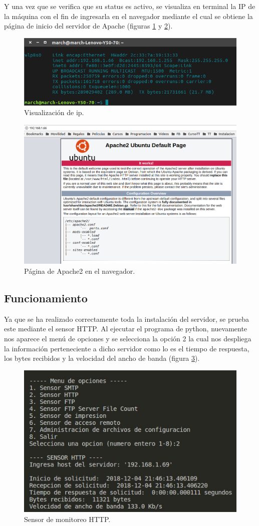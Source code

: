 Y una vez que se verifica que su status es activo, se visualiza en terminal la IP de la máquina con el fin de ingresarla en el navegador mediante el cual se obtiene la página de inicio del servidor de Apache (figuras \ref{image:http3} y \ref{image:http4}).

\FloatBarrier
\begin{figure}[htbp!]
		\centering
			\includegraphics[width=.75 \textwidth]{images/http3}
		\caption{Visualización de ip.}
		\label{image:http3}
\end{figure}
\FloatBarrier

\FloatBarrier
\begin{figure}[htbp!]
		\centering
			\includegraphics[width=.75 \textwidth]{images/http4}
		\caption{Página de Apache2 en el navegador.}
		\label{image:http4}
\end{figure}
\FloatBarrier

\subsection{Funcionamiento}
Ya que se ha realizado correctamente toda la instalación del servidor, se prueba este mediante el sensor HTTP. Al ejecutar el programa de python, nuevamente nos aparece el menú de opciones y se selecciona la opción 2 la cual nos despliega la información perteneciente a dicho servidor como lo es el tiempo de respuesta, los bytes recibidos y la velocidad del ancho de banda (figura \ref{image:http5}).

\FloatBarrier
\begin{figure}[htbp!]
		\centering
			\includegraphics[width=.6\textwidth]{images/http5}
		\caption{Sensor de monitoreo HTTP.}
		\label{image:http5}
\end{figure}
\FloatBarrier

